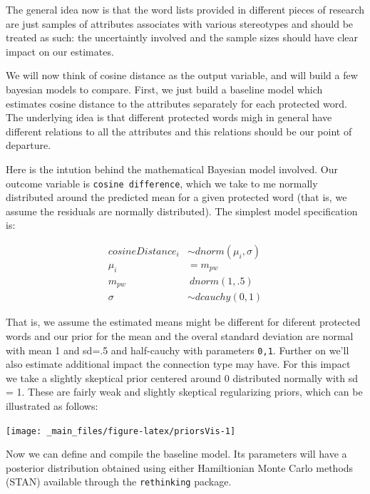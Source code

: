 \documentclass[]{book}
\begin{document}
The general idea now is that the word lists provided in different pieces
of research are just samples of attributes associates with various
stereotypes and should be treated as such: the uncertaintly involved and
the sample sizes should have clear impact on our estimates.

We will now think of cosine distance as the output variable, and will
build a few bayesian models to compare. First, we just build a baseline
model which estimates cosine distance to the attributes separately for
each protected word. The underlying idea is that different protected
words migh in general have different relations to all the attributes and
this relations should be our point of departure.

Here is the intution behind the mathematical Bayesian model involved.
Our outcome variable is \texttt{cosine\ difference}, which we take to me
normally distributed around the predicted mean for a given protected
word (that is, we assume the residuals are normally distributed). The
simplest model specification is:

\begin{align}
cosineDistance_i  & \sim dnorm(\mu_i, \sigma) \\
\mu_i & = m_{pw} \\
m_{pw} & ~ dnorm(1,.5) \\
\sigma &\sim  dcauchy(0,1)
\end{align}

That is, we assume the estimated means might be different for diferent
protected words and our prior for the mean and the overal standard
deviation are normal with mean 1 and sd=.5 and half-cauchy with
parameters \texttt{0,1}. Further on we'll also estimate additional
impact the connection type may have. For this impact we take a slightly
skeptical prior centered around 0 distributed normally with sd = 1.
These are fairly weak and slightly skeptical regularizing priors, which
can be illustrated as follows:

\vspace{2mm}

\begin{center}\texttt{[image: \_main\_files/figure-latex/priorsVis-1]} \end{center}

Now we can define and compile the baseline model. Its parameters will
have a posterior distribution obtained using either Hamiltionian Monte
Carlo methods (STAN) available through the \texttt{rethinking} package.
\end{document}
